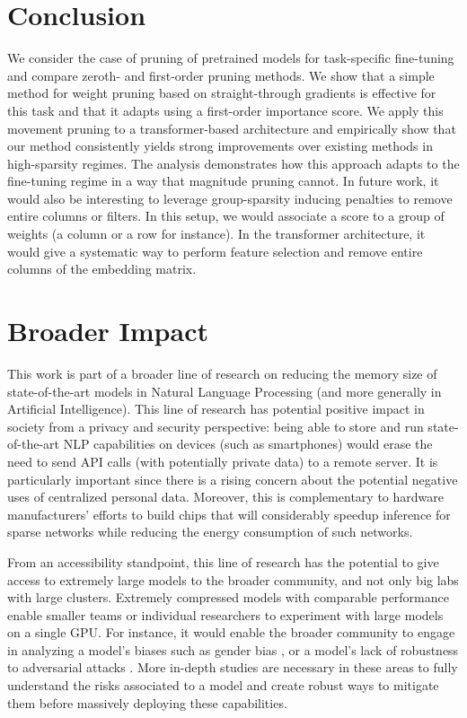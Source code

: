 \documentclass{article}
\begin{document}
\section{Conclusion}

We consider the case of pruning of pretrained models for task-specific fine-tuning and compare zeroth- and first-order pruning methods. We show that a simple method for weight pruning based on straight-through gradients is effective for this task and that it adapts using a first-order importance score. We apply this movement pruning to a transformer-based architecture and empirically show that our method consistently yields strong improvements over existing methods in high-sparsity regimes. The analysis demonstrates how this approach adapts to the fine-tuning regime in a way that magnitude pruning cannot.  In future work, it would also be interesting to leverage group-sparsity inducing penalties \citep{BachSparsity2011} to remove entire columns or filters. In this setup, we would associate a score to a group of weights (a column or a row for instance). In the transformer architecture, it would give a systematic way to perform feature selection and remove entire columns of the embedding matrix.



\section{Broader Impact}

This work is part of a broader line of research on reducing the memory size of state-of-the-art models in Natural Language Processing (and more generally in Artificial Intelligence). This line of research has potential positive impact in society from a privacy and security perspective: being able to store and run state-of-the-art NLP capabilities on devices (such as smartphones) would erase the need to send API calls (with potentially private data) to a remote server. It is particularly important since there is a rising concern about the potential negative uses of centralized personal data. Moreover, this is complementary to hardware manufacturers' efforts to build chips that will considerably speedup inference for sparse networks while reducing the energy consumption of such networks.

From an accessibility standpoint, this line of research has the potential to give access to extremely large models \citep{Raffel2019ExploringTL,brown2020language} to the broader community, and not only big labs with large clusters. Extremely compressed models with comparable performance enable smaller teams or individual researchers to experiment with large models on a single GPU. For instance, it would enable the broader community to engage in analyzing a model's biases such as gender bias \citep{Lu2018GenderBI,Vig2020CausalMA}, or a model's lack of robustness to adversarial attacks \citep{Wallace2019UniversalAT}. More in-depth studies are necessary in these areas to fully understand the risks associated to a model and create robust ways to mitigate them before massively deploying these capabilities.
\end{document}

